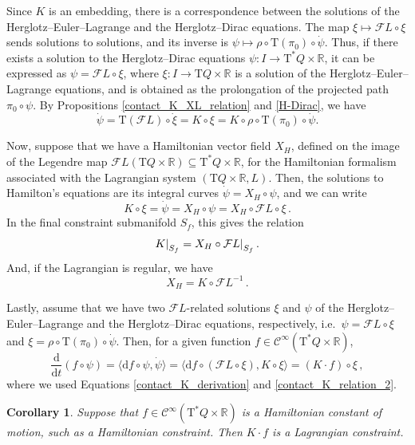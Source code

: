 \documentclass[11pt]{article}
\theoremstyle{plain}
\newtheorem{corollary}[theorem]{Corollary}
\theoremstyle{definition}
\newcommand\restr[2]{{%
  \left.\kern-\nulldelimiterspace %
  #1 %
  \right|_{#2} %
}}
\newcommand{\R}{\mathbb{R}}
\renewcommand{\d}{\mathrm{d}}
\newcommand{\Cinfty}{\mathscr{C}^\infty}
\newcommand{\T}{{\mathrm T}}
\let\Tan\T
\def\d{\mathrm{d}}
\def\d{\mathrm{d}}
\def\Tan{\mathrm{T}}
\def\FL{\mathcal{F} L}
\begin{document}
Since $K$ is an embedding, there is a correspondence between the solutions of the Herglotz--Euler--Lagrange and the Herglotz--Dirac equations. The map $\xi \mapsto \FL \circ\xi$ sends solutions to solutions, and its inverse is $\psi \mapsto \rho \circ \Tan(\pi_0)\circ \dot\psi$.
Thus, if there exists a solution to the Herglotz--Dirac equations $\psi \colon I \to \Tan^*Q \times \R$, it can be expressed as 
$\psi = \FL \circ \xi$, where $\xi \colon I \to \Tan Q\times \R$ is a solution of the Herglotz--Euler--Lagrange equations, and is obtained as the prolongation of the projected path $\pi_0 \circ \psi$.
By Propositions \ref{contact_K_XL_relation} and \ref{H-Dirac}, we have
\begin{equation}\label{contact_K_relation_1}
    \dot\psi = \Tan (\FL) \circ \dot{\xi} = K\circ \xi = K \circ \rho \circ \Tan (\pi_0) \circ \dot \psi. 
\end{equation}

Now, suppose that we have a Hamiltonian vector field $X_H$, defined on the image of the Legendre map $\FL(\Tan Q\times \R) \subseteq \Tan^*Q\times \R$, 
for the Hamiltonian formalism associated with the Lagrangian system $(\Tan Q \times \R, L)$. Then, the solutions to Hamilton's equations are its integral curves 
$\dot\psi=X_H \circ \psi$, and we can write
\begin{equation} \label{contact_K_relation_2}
    K\circ \xi=\dot\psi = X_H \circ \psi = X_H \circ \FL \circ \xi\,.
\end{equation}
In the final constraint submanifold $S_f$, this gives the relation
\begin{equation}
    \restr{K}{S_f} = X_H\circ \restr{\FL}{S_f} \,.
\end{equation}
And, if the Lagrangian is regular, we have
$$X_H = K\circ \FL^{-1}\,.$$

Lastly, assume that we have two $\FL$-related solutions $\xi$ and $\psi$ of the Herglotz--Euler--Lagrange and the Herglotz--Dirac equations, respectively, i.e.\ $\psi = \FL \circ {\xi}$
and $\xi = \rho\circ\Tan(\pi_0) \circ \dot\psi$. Then, for a given function $f\in\Cinfty(\Tan^* Q\times \R)$,
\begin{equation}
    \frac{\d}{\d t}(f\circ \psi) = \langle \d f \circ \psi, \dot\psi \rangle = \langle \d f \circ (\FL \circ  \xi), K\circ {\xi} \rangle = (K\cdot f ) \circ \xi \,,
\end{equation}
where we used Equations \eqref{contact_K_derivation} and \eqref{contact_K_relation_2}.

\begin{corollary}\label{K_contact_constraints}
Suppose that \( f \in \Cinfty(\Tan^*Q \times \mathbb{R}) \) is a Hamiltonian constant of motion, such as a Hamiltonian constraint. Then $K\cdot f$ is a Lagrangian constraint.
\end{corollary}
\end{document}
